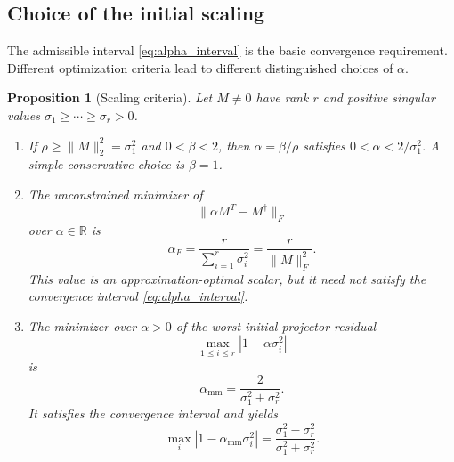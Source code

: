 \documentclass[12pt,a4paper]{article}
\theoremstyle{plain}
\newtheorem{proposition}[theorem]{Proposition}
\theoremstyle{definition}
\theoremstyle{remark}
\begin{document}
\subsection{Choice of the initial scaling}
The admissible interval \eqref{eq:alpha_interval} is the basic convergence requirement. Different optimization criteria lead to different distinguished choices of \(\alpha\).

\begin{proposition}[Scaling criteria] \label{prop:alpha_choices}
Let \(M\neq0\) have rank \(r\) and positive singular values \(\sigma_1\geq\cdots\geq\sigma_r>0\).
\begin{enumerate}
    \item If \(\rho\geq\|M\|_2^2=\sigma_1^2\) and \(0<\beta<2\), then $\displaystyle \alpha=\beta / \rho$ satisfies \(0<\alpha<2/\sigma_1^2\). A simple conservative choice is \(\beta=1\).

    \item The unconstrained minimizer of
    \[
        \|\alpha M^T-M^\dagger\|_F
    \]
    over \(\alpha\in\mathbb{R}\) is
    \begin{equation} \label{eq:alpha_F}
        \alpha_F=\frac{r}{\sum_{i=1}^r\sigma_i^2} =\frac{r}{\|M\|_F^2}.
    \end{equation}
    This value is an approximation-optimal scalar, but it need not satisfy the convergence interval \eqref{eq:alpha_interval}.

    \item The minimizer over \(\alpha>0\) of the worst initial projector residual
    \[
        \max_{1\leq i\leq r}|1-\alpha\sigma_i^2|
    \]
    is
    \begin{equation} \label{eq:alpha_minimax}
        \alpha_{\mathrm{mm}} =\frac{2}{\sigma_1^2+\sigma_r^2}.
    \end{equation}
    It satisfies the convergence interval and yields
    \[
        \max_i|1-\alpha_{\mathrm{mm}}\sigma_i^2| =\frac{\sigma_1^2-\sigma_r^2}{\sigma_1^2+\sigma_r^2}.
    \]
\end{enumerate}
\end{proposition}
\end{document}
